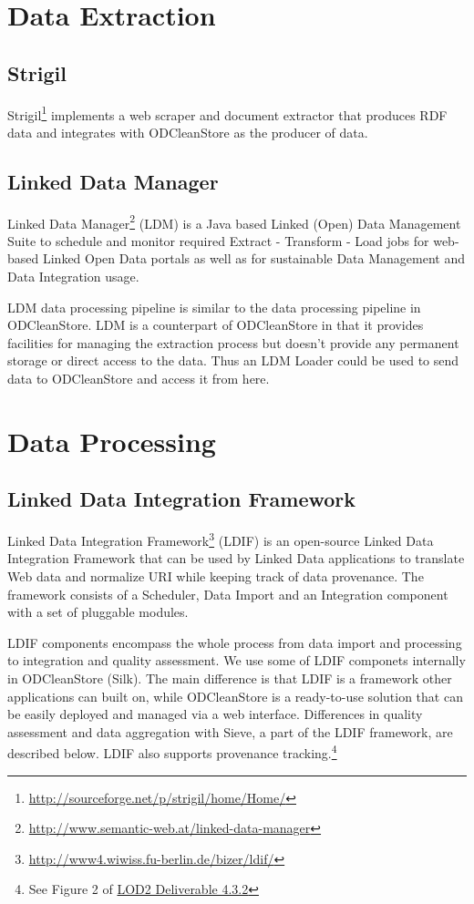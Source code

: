 \section{Data Extraction}


\subsection*{Strigil}

Strigil\footnote{\url{http://sourceforge.net/p/strigil/home/Home/}} implements a web scraper and document extractor that produces RDF data and integrates with ODCleanStore as the producer of data.

\subsection*{Linked Data Manager}
Linked Data Manager\footnote{\url{http://www.semantic-web.at/linked-data-manager}} (LDM) is a Java based Linked (Open) Data Management Suite to schedule and monitor required Extract - Transform - Load jobs for web-based Linked Open Data portals as well as for sustainable Data Management and Data Integration usage.

LDM data processing pipeline is similar to the data processing pipeline in ODCleanStore. LDM is a counterpart of ODCleanStore in that it provides facilities for managing the extraction process but doesn't provide any permanent storage or direct access to the data. Thus an LDM Loader could be used to send data to ODCleanStore and access it from here.

\section{Data Processing}

\subsection*{Linked Data Integration Framework}
Linked Data Integration Framework\footnote{\url{http://www4.wiwiss.fu-berlin.de/bizer/ldif/}} (LDIF) is an open-source Linked Data Integration Framework that can be used by Linked Data applications to translate Web data and normalize URI while keeping track of data provenance.
The framework consists of a Scheduler, Data Import and an Integration component with a set of pluggable modules.

LDIF components encompass the whole process from data import and processing to integration and quality assessment. We use some of LDIF componets internally in ODCleanStore (Silk). The main difference is that LDIF is a framework other applications can built on, while ODCleanStore is a ready-to-use solution that can be easily deployed and managed via a web interface. Differences in quality assessment and data aggregation with Sieve, a part of the LDIF framework, are described below. LDIF also supports provenance tracking.\footnote{See Figure 2 of \href{http://static.lod2.eu/Deliverables/deliverable-4.3.2.pdf}{LOD2 Deliverable 4.3.2}}

